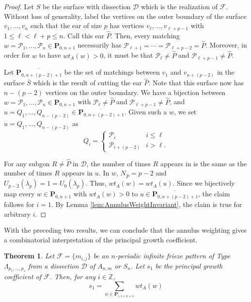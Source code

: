 \documentclass[12pt]{article}
\newtheorem{theorem}{Theorem}
\theoremstyle{remark}
\newcommand*{\pathset}[2]{\mathbf{P}_{#1,#2}}
\newcommand*{\poly}[1]{\mathcal{P}_{#1}}
\newcommand*{\F}{\mathcal{F}}
\newcommand*{\D}{\mathcal{D}}
\begin{document}
\begin{proof}
Let $S$ be the surface with dissection $\D$ which is the realization of $\F$. Without loss of generality, label the vertices on the outer boundary of the surface $v_1,\ldots,v_n$ such that the ear of size $p$ has vertices $v_\ell,\ldots,v_{\ell + p-1}$ with $1 \leq \ell < \ell + p \leq n$. Call this ear $\widehat{P}$. Then, every matching $w = \poly{1},\ldots,\poly{n} \in \pathset{0}{n+1}$  necessarily has $\poly{\ell+1} = \cdots = \poly{\ell+p-2} = \widehat{P}$. Moreover, in order for $w$ to have $wt_A(w) > 0$, it must be that $\poly{\ell} \neq \widehat{P}$ and $\poly{\ell + p -1} \neq \widehat{P}$. 

Let $\overline{\pathset{0}{n+(p-2)+1}}$ be the set of matchings between $v_1$ and $v_{n+(p-2)}$ in the surface $\overline{S}$ which is the result of cutting the ear $\widehat{P}$. Note that this surface now has $n - (p-2)$ vertices on the outer boundary. We have a bijection between $w = \poly{1},\ldots,\poly{n} \in \pathset{0}{n+1}$ with $\poly{\ell} \neq \widehat{P}$ and $\poly{\ell + p -1} \neq \widehat{P}$, and $u = Q_1,\ldots,Q_{n-(p-2)} \in \overline{\pathset{0}{n+(p-2)+1}}$. Given such a $w$, we set $u = Q_1,\ldots,Q_{n-(p-2)}$ as \[
Q_i = \begin{cases} \poly{i} & i \leq \ell \\ \poly{i+(p-2)} & i > \ell.
\end{cases}
\]

For any subgon $R \neq \widehat{P}$ in $\D$, the number of times $R$ appears in is the same as the number of times $R$ appears in $u$. In $w$, $N_{\widehat{P}} = p-2$ and $U_{p-2}(\lambda_p) = 1 = U_0(\lambda_p)$. Thus, $wt_A(w) = wt_A(u)$. Since we bijectively map every $w \in \pathset{0}{n+1}$ with $wt_A(w) > 0$ to $u \in \overline{\pathset{0}{n+(p-2)+1}}$, the claim follows for $i = 1$. By Lemma \ref{lem:AnnulusWeightInvariant}, the claim is true for arbitrary $i$. 
\end{proof}

With the preceding two results, we can conclude that the annulus weighting gives a combinatorial interpretation of the principal growth coefficient.


\begin{theorem}\label{thm:CombinatorialGrowthC}
Let $\F = \{m_{i,j}\}$ be an $n$-periodic infinite frieze pattern of Type $\Lambda_{p_1,\ldots,p_s}$ from a dissection $\D$ of $A_{n,m}$ or $S_n$. Let $s_1$ be the principal growth coefficient of $\F$. Then, for any $i \in  \mathbb{Z}$,\[
s_1 = \sum_{w \in \pathset{i}{i+n+1}} wt_A(w)
\]
\end{theorem}
\end{document}
